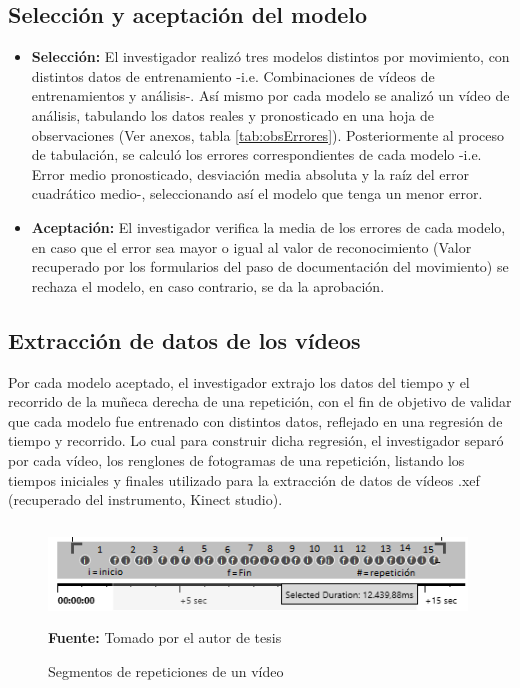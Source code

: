 \subsection{Selecci\'on y aceptaci\'on del modelo}
\begin{itemize}
\item \textbf{Selecci\'on:} El investigador realiz\'o tres modelos distintos por movimiento, con distintos datos de entrenamiento -i.e. Combinaciones de v\'ideos de entrenamientos y an\'alisis-. As\'i mismo por cada modelo se analiz\'o un v\'ideo de an\'alisis, tabulando los datos reales y pronosticado en una hoja de observaciones (Ver anexos, tabla \ref{tab:obsErrores}). Posteriormente al proceso de tabulaci\'on, se calcul\'o los errores correspondientes de cada modelo -i.e. Error medio pronosticado, desviaci\'on media absoluta y la ra\'iz del error cuadr\'atico medio-, seleccionando as\'i el modelo que tenga un menor error. 
\item \textbf{Aceptaci\'on:} El investigador  verifica la media de los errores de cada modelo, en caso que el error sea mayor o igual  al valor de reconocimiento (Valor recuperado por los formularios del paso de documentaci\'on del movimiento) se rechaza el modelo, en caso contrario, se da la aprobaci\'on.
\end{itemize}
\subsection{Extracci\'on de datos de los v\'ideos}
Por cada modelo aceptado, el investigador extrajo los datos del tiempo y el recorrido de la mu\~neca derecha de una repetici\'on, con el fin de objetivo de validar que cada modelo fue entrenado con distintos datos, reflejado en una  regresi\'on de tiempo y recorrido. Lo cual para construir dicha regresi\'on, el investigador separ\'o por cada v\'ideo, los renglones de fotogramas de una repetici\'on, listando los tiempos iniciales y finales utilizado para la extracci\'on de datos de v\'ideos .xef (recuperado del instrumento, Kinect studio).
\begin{figure}[H]
	\caption{Segmentos de repeticiones de un v\'ideo}
	\label{fig:segVideo}
	\centering
	\includegraphics[width=420px,height=100px]{graphics/separarPuntos.PNG} \\
	\textbf{Fuente:} Tomado por el autor de tesis
\end{figure} 
